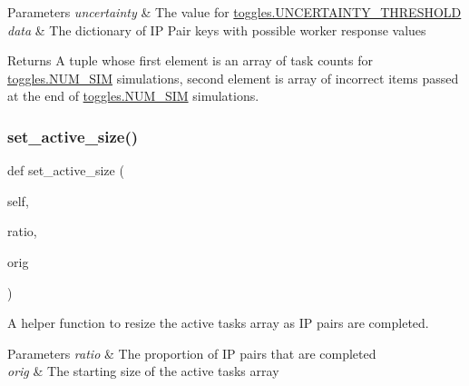 \begin{DoxyParams}{Parameters}
{\em uncertainty} & The value for \mbox{\hyperlink{namespacedynamicfilterapp_1_1toggles_aaefdc27b85545eb4a910f5c65f7d8bbb}{toggles.\+U\+N\+C\+E\+R\+T\+A\+I\+N\+T\+Y\+\_\+\+T\+H\+R\+E\+S\+H\+O\+LD}} \\
\hline
{\em data} & The dictionary of IP Pair keys with possible worker response values \\
\hline
\end{DoxyParams}
\begin{DoxyReturn}{Returns}
A tuple whose first element is an array of task counts for \mbox{\hyperlink{namespacedynamicfilterapp_1_1toggles_a3baf5565851cd87736238d8dddfc1106}{toggles.\+N\+U\+M\+\_\+\+S\+IM}} simulations, second element is array of incorrect items passed at the end of \mbox{\hyperlink{namespacedynamicfilterapp_1_1toggles_a3baf5565851cd87736238d8dddfc1106}{toggles.\+N\+U\+M\+\_\+\+S\+IM}} simulations. 
\end{DoxyReturn}
\mbox{\label{classdynamicfilterapp_1_1test__simulations_1_1_simulation_test_a966a3c31662ba0c8c2d3d095899ec1ad}} 
\subsubsection{\texorpdfstring{set\+\_\+active\+\_\+size()}{set\_active\_size()}}
{\footnotesize\ttfamily def set\+\_\+active\+\_\+size (\begin{DoxyParamCaption}\item[{}]{self,  }\item[{}]{ratio,  }\item[{}]{orig }\end{DoxyParamCaption})}



A helper function to resize the active tasks array as IP pairs are completed. 


\begin{DoxyParams}{Parameters}
{\em ratio} & The proportion of IP pairs that are completed \\
\hline
{\em orig} & The starting size of the active tasks array \\
\hline
\end{DoxyParams}
\mbox{\label{classdynamicfilterapp_1_1test__simulations_1_1_simulation_test_aad2d8e9dd7aa97a8929ef0f348af5f52}} 

